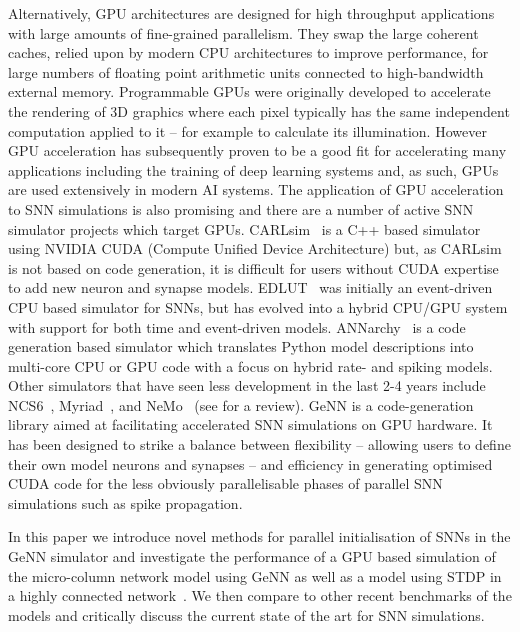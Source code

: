 \documentclass[utf8]{frontiersSCNS} %
\begin{document}
Alternatively, GPU architectures are designed for high throughput applications with large amounts of fine-grained parallelism.
They swap the large coherent caches, relied upon by modern CPU architectures to improve performance, for large numbers of floating point arithmetic units connected to high-bandwidth external memory. 
Programmable GPUs were originally developed to accelerate the rendering of 3D graphics where each pixel typically has the same independent computation applied to it -- for example to calculate its illumination.
However GPU acceleration has subsequently proven to be a good fit for accelerating many applications including the training of deep learning systems and, as such, GPUs are used extensively in modern AI systems. 
The application of GPU acceleration to SNN simulations is also promising and there are a number of active SNN simulator projects which target GPUs. 
CARLsim~\citep{Chou2018} is a C++ based simulator using NVIDIA CUDA (Compute Unified Device Architecture) but, as CARLsim is not based on code generation, it is difficult for users without CUDA expertise to add new neuron and synapse models.
EDLUT~\citep{Garrido2011} was initially an event-driven CPU based simulator for SNNs, but has evolved into a hybrid CPU/GPU system with support for both time and event-driven models.
ANNarchy~\citep{Vitay2015} is a code generation based simulator which translates Python model descriptions into multi-core CPU or GPU code with a focus on hybrid rate- and spiking models.
Other simulators that have seen less development in the last 2-4 years include NCS6~\citep{Hoang2013}, Myriad~\citep{Rittner2016}, and NeMo~\citep{Fidjeland2009} (see \citet{Brette2012} for a review).
GeNN \citep{Yavuz2016} is a code-generation library aimed at facilitating accelerated SNN simulations on GPU hardware.
It has been designed to strike a balance between flexibility -- allowing users to define their own model neurons and synapses -- and efficiency in generating optimised CUDA code for the less obviously parallelisable phases of parallel SNN simulations such as spike propagation.

In this paper we introduce novel methods for parallel initialisation of SNNs in the GeNN simulator and investigate the performance of a GPU based simulation of the micro-column network model \citep{Potjans2012} using GeNN as well as a model using STDP in a highly connected network~\citep{Morrison2007}.
We then compare to other recent benchmarks of the models \citep{VanAlbada2018} and critically discuss the current state of the art for SNN simulations.
\end{document}
